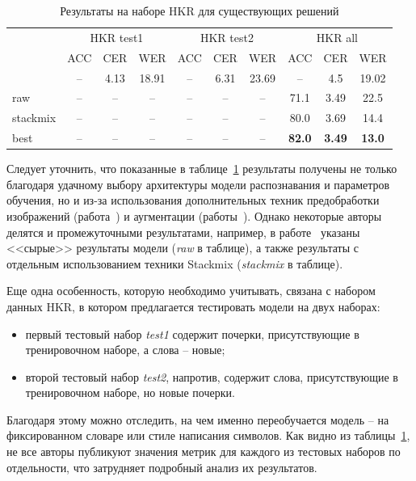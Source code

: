 \begin{table}[h!]
    \centering
    \begin{tabular}{|p{2.5cm}|c|c|c|c|c|c|c|c|c|}
        \hline
        & \multicolumn{3}{c|}{HKR test1} & \multicolumn{3}{c|}{HKR test2} & \multicolumn{3}{c|}{HKR all} \\
        \cline{2-10}
        &  ACC  &  CER  &  WER  &  ACC  &  CER  &  WER  &  ACC  &  CER  &  WER  \\
        \hline
        \hline
        \cite{abdallah2020attention}          & -- & 4.13 & 18.91 & -- & 6.31 & 23.69 & -- & 4.5 & 19.02 \\
        \hline
        \cite{shonenkov2021stackmix} raw      & -- & -- & -- & -- & -- & -- & 71.1 & 3.49 & 22.5 \\
        \hline
        \cite{shonenkov2021stackmix} stackmix & -- & -- & -- & -- & -- & -- & 80.0 & 3.69 & 14.4 \\
        \hline
        \cite{shonenkov2021stackmix} best     & -- & -- & -- & -- & -- & -- & \textbf{82.0} & \textbf{3.49} & \textbf{13.0} \\
        \hline
    \end{tabular}

    \caption{Результаты на наборе HKR для существующих решений}
    \label{tab:other_results}
\end{table}

Следует уточнить, что показанные в таблице~\ref{tab:other_results} результаты получены не только благодаря удачному
выбору архитектуры модели распознавания и параметров обучения, но и из-за использования дополнительных техник
предобработки изображений (работа~\cite{abdallah2020attention}) и аугментации (работы~\cite{abdallah2020attention,shonenkov2021stackmix}).
Однако некоторые авторы делятся и промежуточными результатами, например, в работе~\cite{shonenkov2021stackmix} указаны <<сырые>> результаты модели (\textit{raw} в таблице),
а также результаты с отдельным использованием техники Stackmix (\textit{stackmix} в таблице).

Еще одна особенность, которую необходимо учитывать, связана с набором данных HKR, в котором предлагается тестировать модели на двух наборах:
\begin{itemize}
    \item первый тестовый набор \textit{test1} содержит почерки, присутствующие в тренировочном наборе, а слова -- новые;
    \item второй тестовый набор \textit{test2}, напротив, содержит слова, присутствующие в тренировочном наборе, но новые почерки.
\end{itemize}
Благодаря этому можно отследить, на чем именно переобучается модель -- на фиксированном словаре или стиле написания символов.
Как видно из таблицы~\ref{tab:other_results}, не все авторы публикуют значения метрик для каждого из тестовых наборов по отдельности,
что затрудняет подробный анализ их результатов.

